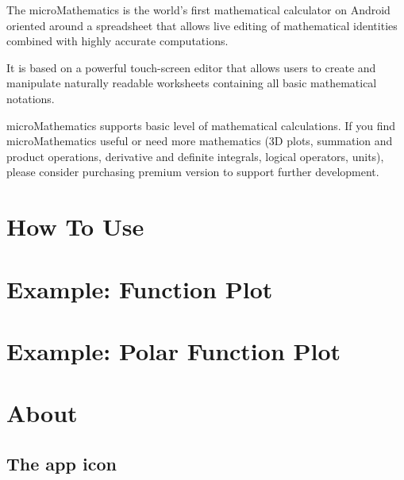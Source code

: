 \documentclass[DIV=calc, paper=a4, fontsize=11pt, twocolumn]{scrartcl}
\begin{document}
\maketitle
\thispagestyle{fancy} %

\begin{bf}
The microMathematics is the world's
first mathematical calculator on
Android oriented around a spreadsheet
that allows live editing of
mathematical identities combined with
highly accurate computations.

It is based on a powerful touch-screen
editor that allows users to create and
manipulate naturally readable
worksheets containing all basic
mathematical notations.

microMathematics supports basic level
of mathematical calculations. If you
find microMathematics useful or need
more mathematics (3D plots, summation
and product operations, derivative and
definite integrals, logical operators,
units), please consider purchasing
premium version to support
further development.
\end{bf}

\section{How To Use}


\section{Example: Function Plot}


\section{Example: Polar Function Plot}


\section{About}

\subsection*{The app icon}
\end{document}
